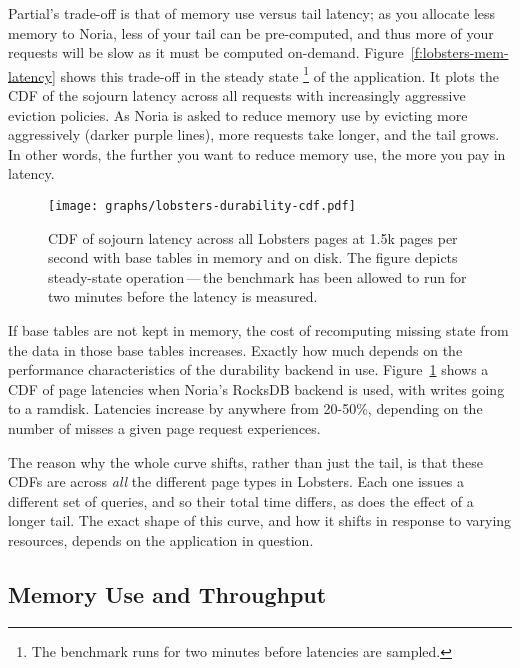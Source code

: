 Partial's trade-off is that of memory use versus tail latency; as you allocate
less memory to Noria, less of your tail can be pre-computed, and thus more of
your requests will be slow as it must be computed on-demand.
Figure~\ref{f:lobsters-mem-latency} shows this trade-off in the steady state%
\footnote{The benchmark runs for two minutes before latencies are sampled.}
of the application. It plots the CDF of the sojourn latency across all requests
with increasingly aggressive eviction policies. As Noria is asked to
reduce memory use by evicting more aggressively (darker purple lines), more
requests take longer, and the tail grows. In other words, the further you want
to reduce memory use, the more you pay in latency.

\begin{figure}[h]
  \centering
  \texttt{[image: graphs/lobsters-durability-cdf.pdf]}
  \caption{CDF of sojourn latency across all Lobsters pages at 1.5k pages per
  second with base tables in memory and on disk. The figure depicts steady-state
  operation\,---\,the benchmark has been allowed to run for two minutes before
  the latency is measured.}
  \label{f:lobsters-dur-latency}
\end{figure}

If base tables are not kept in memory, the cost of recomputing missing state
from the data in those base tables increases. Exactly how much depends on the
performance characteristics of the durability backend in use.
Figure~\ref{f:lobsters-dur-latency} shows a CDF of page latencies when Noria's
RocksDB backend is used, with writes going to a ramdisk. Latencies increase by
anywhere from 20-50\%, depending on the number of misses a given page request
experiences.

The reason why the whole curve shifts, rather than just the tail, is that these
CDFs are across \emph{all} the different page types in Lobsters. Each one issues
a different set of queries, and so their total time differs, as does the effect
of a longer tail. The exact shape of this curve, and how it shifts in response
to varying resources, depends on the application in question.


\subsection{Memory Use and Throughput}


